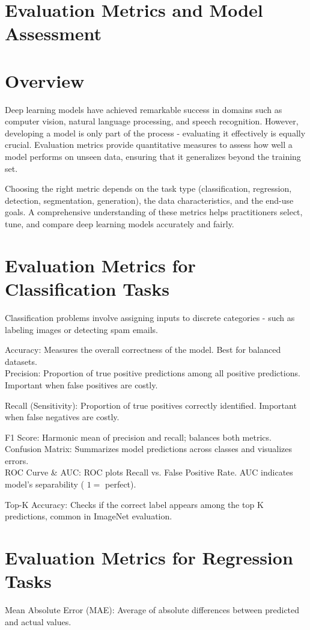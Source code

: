 \documentclass[10pt]{article}
\begin{document}
\section*{Evaluation Metrics and Model Assessment}
\section*{Overview}
Deep learning models have achieved remarkable success in domains such as computer vision, natural language processing, and speech recognition. However, developing a model is only part of the process - evaluating it effectively is equally crucial. Evaluation metrics provide quantitative measures to assess how well a model performs on unseen data, ensuring that it generalizes beyond the training set.

Choosing the right metric depends on the task type (classification, regression, detection, segmentation, generation), the data characteristics, and the end-use goals. A comprehensive understanding of these metrics helps practitioners select, tune, and compare deep learning models accurately and fairly.

\section*{Evaluation Metrics for Classification Tasks}
Classification problems involve assigning inputs to discrete categories - such as labeling images or detecting spam emails.

Accuracy: Measures the overall correctness of the model. Best for balanced datasets.\\
Precision: Proportion of true positive predictions among all positive predictions. Important when false positives are costly.

Recall (Sensitivity): Proportion of true positives correctly identified. Important when false negatives are costly.

F1 Score: Harmonic mean of precision and recall; balances both metrics.\\
Confusion Matrix: Summarizes model predictions across classes and visualizes errors.\\
ROC Curve \& AUC: ROC plots Recall vs. False Positive Rate. AUC indicates model's separability ( $1=$ perfect).

Top-K Accuracy: Checks if the correct label appears among the top K predictions, common in ImageNet evaluation.

\section*{Evaluation Metrics for Regression Tasks}
Mean Absolute Error (MAE): Average of absolute differences between predicted and actual values.
\end{document}
